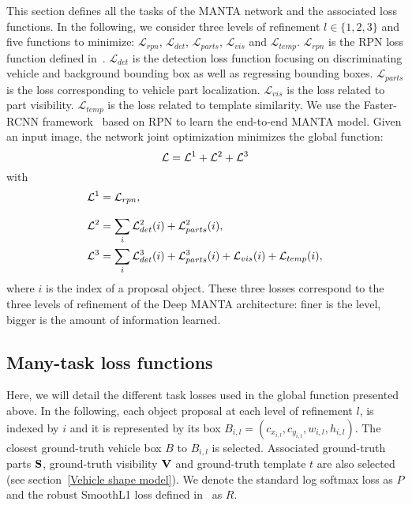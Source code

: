 \documentclass[10pt,twocolumn,letterpaper]{article}
\begin{document}
This section defines all the tasks of the MANTA network and the associated loss functions.
In the following, we consider three levels of refinement $l \in \{1,2,3\}$ and five functions to minimize: $\mathcal{L}_{rpn}$, $\mathcal{L}_{det}$, $\mathcal{L}_{parts}$, $\mathcal{L}_{vis}$ and $\mathcal{L}_{temp}$. $\mathcal{L}_{rpn}$ is the RPN loss function defined in~\cite{faster}. $\mathcal{L}_{det}$ is the detection loss function focusing on discriminating vehicle and background bounding box as well as regressing bounding boxes. $\mathcal{L}_{parts}$ is the loss corresponding to vehicle part localization. $\mathcal{L}_{vis}$ is the loss related to part visibility. $\mathcal{L}_{temp}$ is the loss related to template similarity. We use the Faster-RCNN framework~\cite{faster} based on RPN to learn the end-to-end MANTA model. Given an input image, the network joint optimization minimizes the global function:
\begin{equation}
\mathcal{L} = \mathcal{L}^{1} + \mathcal{L}^{2} + \mathcal{L}^{3} \notag
\end{equation}
with
\begin{align}
\mathcal{L}^1 &=  \mathcal{L}_{rpn}, \notag \\[8pt]
\mathcal{L}^2 &= \sum_i \mathcal{L}_{det}^2(i) + \mathcal{L}_{parts}^2(i), \notag \\
\mathcal{L}^3 &=  \sum_i  \mathcal{L}_{det}^3(i) + \mathcal{L}_{parts}^3(i) +  \mathcal{L}_{vis}(i) + \mathcal{L}_{temp}(i), \notag 
\end{align}
where $i$ is the index of a proposal object. These three losses correspond to the three levels of refinement of the Deep MANTA architecture: finer is the level, bigger is the amount of information learned.

\subsection{Many-task loss functions}
\label{manytask_training}
Here, we will detail the different task losses used in the global function presented above. In the following, each object proposal at each level of refinement $l$, is indexed by $i$ and it is represented by its box $B_{i,l}=(c_{x_{i,l}},c_{y_{i,l}},w_{i,l},h_{i,l})$. 
The closest ground-truth vehicle box $B$ to $B_{i,l}$ is selected. Associated ground-truth parts $\bold{S}$, ground-truth visibility $\bold{V}$ and ground-truth template $t$ are also selected (see section~\ref{Vehicle shape model}). We denote the standard log softmax loss as $P$ and the robust SmoothL1 loss defined in~\cite{fast} as $R$.
\end{document}
